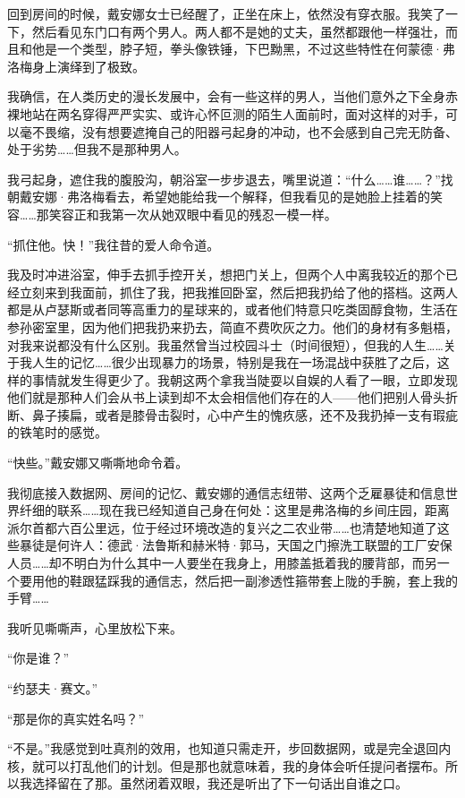 \documentclass[AutoFakeBold=true]{book}
\begin{document}
回到房间的时候，戴安娜女士已经醒了，正坐在床上，依然没有穿衣服。我笑了一下，然后看见东门口有两个男人。两人都不是她的丈夫，虽然都跟他一样强壮，而且和他是一个类型，脖子短，拳头像铁锤，下巴黝黑，不过这些特性在何蒙德·弗洛梅身上演绎到了极致。

我确信，在人类历史的漫长发展中，会有一些这样的男人，当他们意外之下全身赤裸地站在两名穿得严严实实、或许心怀叵测的陌生人面前时，面对这样的对手，可以{\kaishu 毫不}畏缩，{\kaishu 没有}想要遮掩自己的阳器弓起身的冲动，也{\kaishu 不会}感到自己完无防备、处于劣势……但我不是那种男人。

我弓起身，遮住我的腹股沟，朝浴室一步步退去，嘴里说道：``什么……谁……？''找朝戴安娜·弗洛梅看去，希望她能给我一个解释，但我看见的是她脸上挂着的笑容……那笑容正和我第一次从她双眼中看见的残忍一模一样。

``抓住他。{\kaishu 快}！''我往昔的爱人命令道。

我及时冲进浴室，伸手去抓手控开关，想把门关上，但两个人中离我较近的那个已经立刻来到我面前，抓住了我，把我推回卧室，然后把我扔给了他的搭档。这两人都是从卢瑟斯或者同等高重力的星球来的，或者他们特意只吃类固醇食物，生活在参孙密室里，因为他们把我扔来扔去，简直不费吹灰之力。他们的身材有多魁梧，对我来说都没有什么区别。我虽然曾当过校园斗士（时间很短），但我的人生……关于我人生的记忆……很少出现暴力的场景，特别是我在一场混战中获胜了之后，这样的事情就发生得更少了。我朝这两个拿我当陡耍以自娱的人看了一眼，立即发现他们就是那种人们会从书上读到却不太会相信他们存在的人——他们把别人骨头折断、鼻子揍扁，或者是膝骨击裂时，心中产生的愧疚感，还不及我扔掉一支有瑕疵的铁笔时的感觉。

``快些。''戴安娜又嘶嘶地命令着。

我彻底接入数据网、房间的记忆、戴安娜的通信志纽带、这两个乏雇暴徒和信息世界纤细的联系……现在我已经知道自己身在何处：这里是弗洛梅的乡间庄园，距离派尔首都六百公里远，位于经过环境改造的复兴之二农业带……也清楚地知道了这些暴徒是何许人：德武·法鲁斯和赫米特·郭马，天国之门擦洗工联盟的工厂安保人员……却不明白为什么其中一人要坐在我身上，用膝盖抵着我的腰背部，而另一个要用他的鞋跟猛踩我的通信志，然后把一副渗透性箍带套上陇的手腕，套上我的手臂……

我听见嘶嘶声，心里放松下来。

\vspace*{1em}

``你是谁？''

``约瑟夫·赛文。''

``那是你的真实姓名吗？''

``不是。''我感觉到吐真剂的效用，也知道只需走开，步回数据网，或是完全退回内核，就可以打乱他们的计划。但是那也就意味着，我的身体会听任提问者摆布。所以我选择留在了那。虽然闭着双眼，我还是听出了下一句话出自谁之口。
\end{document}
